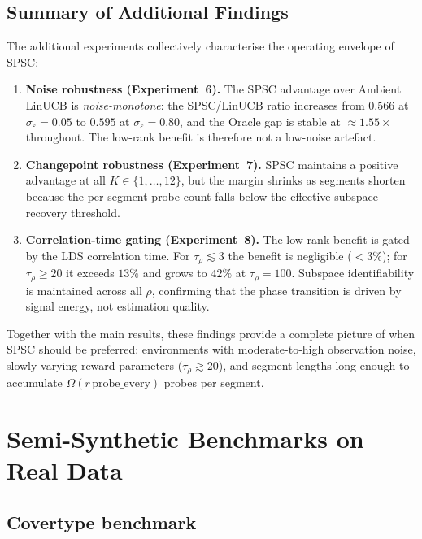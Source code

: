 \documentclass{article}
\begin{document}
\subsection{Summary of Additional Findings}
\label{sec:new_findings_summary}

The additional experiments collectively characterise the operating envelope of SPSC:
\begin{enumerate}
  \item \textbf{Noise robustness (Experiment~6).}
  The SPSC advantage over Ambient LinUCB is \emph{noise-monotone}: the SPSC/LinUCB ratio increases from $0.566$ at $\sigma_\varepsilon{=}0.05$ to $0.595$ at $\sigma_\varepsilon{=}0.80$, and the Oracle gap is stable at $\approx 1.55\times$ throughout. The low-rank benefit is therefore not a low-noise artefact.

  \item \textbf{Changepoint robustness (Experiment~7).}
  SPSC maintains a positive advantage at all $K \in \{1,\ldots,12\}$, but the margin shrinks as segments shorten because the per-segment probe count falls below the effective subspace-recovery threshold.

  \item \textbf{Correlation-time gating (Experiment~8).}
  The low-rank benefit is gated by the LDS correlation time. For $\tau_\rho \lesssim 3$ the benefit is negligible ($< 3\%$); for $\tau_\rho \geq 20$ it exceeds $13\%$ and grows to $42\%$ at $\tau_\rho{=}100$. Subspace identifiability is maintained across all $\rho$, confirming that the phase transition is driven by signal energy, not estimation quality.
\end{enumerate}

\noindent Together with the main results, these findings provide a complete picture of when SPSC should be preferred: environments with moderate-to-high observation noise, slowly varying reward parameters ($\tau_\rho \gtrsim 20$), and segment lengths long enough to accumulate $\Omega(r\,\mathrm{probe\_every})$ probes per segment.

\section{Semi-Synthetic Benchmarks on Real Data}
\label{app:semi_synthetic}

\subsection{Covertype benchmark}
\end{document}
